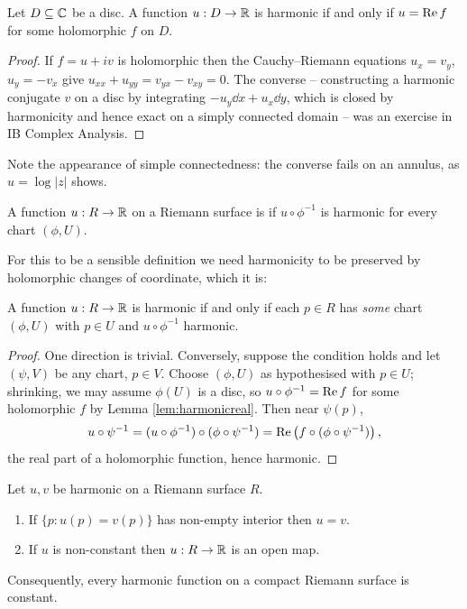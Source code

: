 \documentclass[a4paper]{scrartcl}
\begin{document}
\begin{lemma}\label{lem:harmonicreal}
	Let $D \subseteq \mathbb{C}$ be a disc. A function $u : D \to \mathbb{R}$ is harmonic if and only if
	$u = \operatorname{Re} f$ for some holomorphic $f$ on $D$.
\end{lemma}

\begin{proof}
	If $f = u + iv$ is holomorphic then the Cauchy--Riemann equations $u_x = v_y$,
	$u_y = -v_x$ give $u_{xx} + u_{yy} = v_{yx} - v_{xy} = 0$. The converse -- constructing
	a harmonic conjugate $v$ on a disc by integrating $-u_y\dd x + u_x \dd y$, which is
	closed by harmonicity and hence exact on a simply connected domain -- was an exercise
	in IB Complex Analysis.
\end{proof}

Note the appearance of simple connectedness: the converse fails on an annulus, as
$u = \log|z|$ shows.

\begin{definition}
	A function $u : R \to \mathbb{R}$ on a Riemann surface is  if $u \circ \phi^{-1}$
	is harmonic for every chart $(\phi, U)$.
\end{definition}

For this to be a sensible definition we need harmonicity to be preserved by holomorphic
changes of coordinate, which it is:

\begin{lemma}\label{lem:harmoniconechart}
	A function $u : R \to \mathbb{R}$ is harmonic if and only if each $p \in R$ has \emph{some}
	chart $(\phi, U)$ with $p \in U$ and $u \circ \phi^{-1}$ harmonic.
\end{lemma}

\begin{proof}
	One direction is trivial. Conversely, suppose the condition holds and let $(\psi, V)$
	be any chart, $p \in V$. Choose $(\phi, U)$ as hypothesised with $p \in U$; shrinking,
	we may assume $\phi(U)$ is a disc, so $u\circ\phi^{-1} = \operatorname{Re} f$ for some holomorphic $f$
	by Lemma \ref{lem:harmonicreal}. Then near $\psi(p)$,
	$$
	u \circ \psi^{-1} = (u \circ \phi^{-1})\circ(\phi\circ\psi^{-1}) = \operatorname{Re}\left(f \circ (\phi \circ \psi^{-1})\right),
	$$
	the real part of a holomorphic function, hence harmonic.
\end{proof}

\begin{theorem}
	Let $u, v$ be harmonic on a Riemann surface $R$.
	\begin{enumerate}[label=(\roman*)]
		\item If $\{p : u(p) = v(p)\}$ has non-empty interior then $u = v$.
		\item If $u$ is non-constant then $u : R \to \mathbb{R}$ is an open map.
	\end{enumerate}
	Consequently, every harmonic function on a compact Riemann surface is constant.
\end{theorem}
\end{document}
